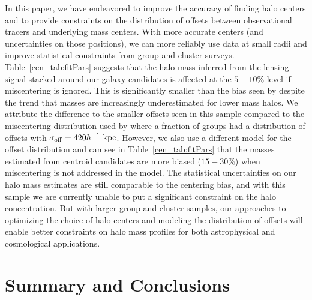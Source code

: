 In this paper, we have endeavored to improve the accuracy of finding
halo centers and to provide constraints on the distribution of offsets
between observational tracers and underlying mass centers. With more
accurate centers (and uncertainties on those positions), we can more
reliably use data at small radii and improve statistical constraints
from group and cluster surveys. Table~\ref{cen_tab:fitPars} suggests
that the halo mass inferred from the lensing signal stacked around our
galaxy candidates is affected at the $5-10\%$ level if miscentering is
ignored. This is significantly smaller than the bias seen by
\citet{Mandelbaum2010} despite the trend that masses are increasingly
underestimated for lower mass halos. We attribute the difference to
the smaller offsets seen in this sample compared to the miscentering
distribution used by \citet{Johnston2007b} where a fraction of groups
had a distribution of offsets with $\sigma_{\rm off}=420 h^{-1}~{\rm
  kpc}$. However, we also use a different model for the offset
distribution and can see in Table~\ref{cen_tab:fitPars} that the masses
estimated from centroid candidates are more biased ($15-30\%$) when
miscentering is not addressed in the model. The statistical
uncertainties on our halo mass estimates are still comparable to the
centering bias, and with this sample we are currently unable to put a
significant constraint on the halo concentration. But with larger
group and cluster samples, our approaches to optimizing the choice of
halo centers and modeling the distribution of offsets will enable
better constraints on halo mass profiles for both astrophysical and
cosmological applications.


\section{Summary and Conclusions}
\label{cen_s:conclusion}

